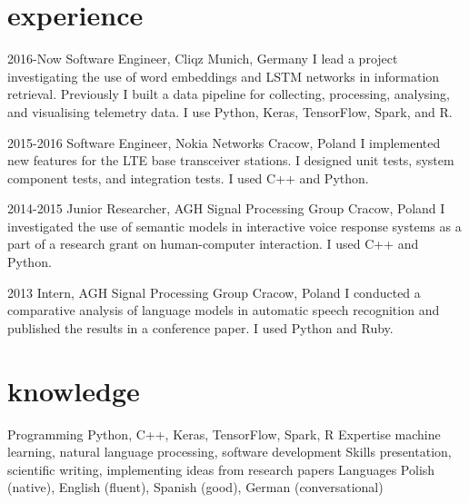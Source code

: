 \documentclass[]{friggeri-cv_osx}
\begin{document}
\section{experience}
\begin{entrylist}
\entry
{2016-Now}
{Software Engineer, Cliqz}
{Munich, Germany}
{I lead a project investigating the use of word embeddings and LSTM networks in information retrieval. Previously I built a data pipeline for collecting, processing, analysing, and visualising telemetry data. I use Python, Keras, TensorFlow, Spark, and R.\\}

\entry
{2015-2016}
{Software Engineer, Nokia Networks}
{Cracow, Poland}
{I implemented new features for the LTE base transceiver stations. I designed unit tests, system component tests, and integration tests. I used C++ and Python.\\}

\entry
{2014-2015}
{Junior Researcher, AGH Signal Processing Group}
{Cracow, Poland}
{I investigated the use of semantic models in interactive voice response systems as a part of a research grant on human-computer interaction. I used C++ and Python.\\}

\entry
{2013}
{Intern, AGH Signal Processing Group}
{Cracow, Poland}
{I conducted a comparative analysis of language models in automatic speech recognition and published the results in a conference paper. I used Python and Ruby.\\}
\end{entrylist}


\section{knowledge}
\begin{entrylist}
\entry
{}
{Programming}
{}
{Python, C++, Keras, TensorFlow, Spark, R}
\entry
{}
{Expertise}
{}
{machine learning, natural language processing, software development}
\entry
{}
{Skills}
{}
{presentation, scientific writing, implementing ideas from research papers}
\entry
{}
{Languages}
{}
{Polish (native), English (fluent), Spanish (good), German (conversational)}
\end{entrylist}
\end{document}
